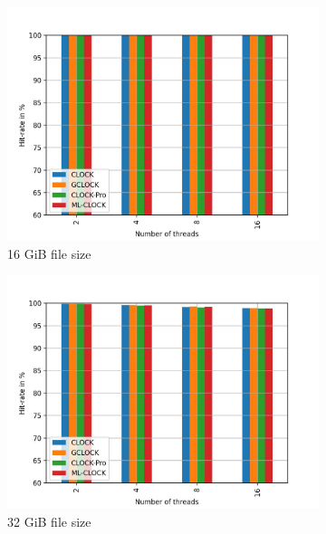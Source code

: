 \documentclass[
	12pt,
	a4paper,
	abstract,
	bibliography=totoc,
	chapterprefix,
	headings=openright,
	numbers=endperiod,
	parskip=half,
	twoside,
]{scrreprt}
\begin{document}
\begin{figure}[H]
	\centering
	\begin{subfigure}{0.4\textwidth}
		\includegraphics[width=\textwidth]{multi_16_gb_rw_90to10_zipf.jpg}		
		\caption{16 GiB file size}
		\label{fig:rw_90to10  zipf}
	\end{subfigure}
	\hfill
	\begin{subfigure}{0.4\textwidth}
		\includegraphics[width=\textwidth]{multi_32_gb_rw_90to10_zipf.jpg}		
		\caption{32 GiB file size}
		\label{fig:rw_90to10  normal}
	\end{subfigure}
	\hfill
	\begin{subfigure}{0.4\textwidth}

\end{subfigure}
\end{figure}
\end{document}
